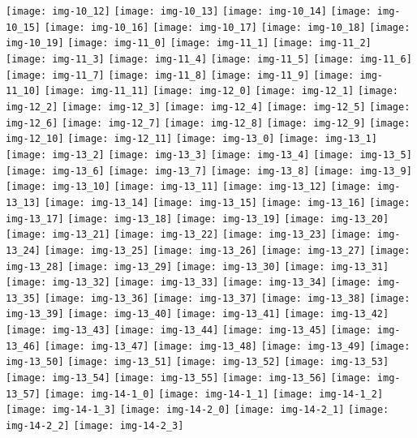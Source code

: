 \documentclass[a4paper]{article}
\begin{document}
	\texttt{[image: img-10\_12]}
	\texttt{[image: img-10\_13]}
	\texttt{[image: img-10\_14]}
	\texttt{[image: img-10\_15]}
	\texttt{[image: img-10\_16]}
	\texttt{[image: img-10\_17]}
	\texttt{[image: img-10\_18]}
	\texttt{[image: img-10\_19]}
	\texttt{[image: img-11\_0]}
	\texttt{[image: img-11\_1]}
	\texttt{[image: img-11\_2]}
	\texttt{[image: img-11\_3]}
	\texttt{[image: img-11\_4]}
	\texttt{[image: img-11\_5]}
	\texttt{[image: img-11\_6]}
	\texttt{[image: img-11\_7]}
	\texttt{[image: img-11\_8]}
	\texttt{[image: img-11\_9]}
	\texttt{[image: img-11\_10]}
	\texttt{[image: img-11\_11]}
	\texttt{[image: img-12\_0]}
	\texttt{[image: img-12\_1]}
	\texttt{[image: img-12\_2]}
	\texttt{[image: img-12\_3]}
	\texttt{[image: img-12\_4]}
	\texttt{[image: img-12\_5]}
	\texttt{[image: img-12\_6]}
	\texttt{[image: img-12\_7]}
	\texttt{[image: img-12\_8]}
	\texttt{[image: img-12\_9]}
	\texttt{[image: img-12\_10]}
	\texttt{[image: img-12\_11]}
	\texttt{[image: img-13\_0]}
	\texttt{[image: img-13\_1]}
	\texttt{[image: img-13\_2]}
	\texttt{[image: img-13\_3]}
	\texttt{[image: img-13\_4]}
	\texttt{[image: img-13\_5]}
	\texttt{[image: img-13\_6]}
	\texttt{[image: img-13\_7]}
	\texttt{[image: img-13\_8]}
	\texttt{[image: img-13\_9]}
	\texttt{[image: img-13\_10]}
	\texttt{[image: img-13\_11]}
	\texttt{[image: img-13\_12]}
	\texttt{[image: img-13\_13]}
	\texttt{[image: img-13\_14]}
	\texttt{[image: img-13\_15]}
	\texttt{[image: img-13\_16]}
	\texttt{[image: img-13\_17]}
	\texttt{[image: img-13\_18]}
	\texttt{[image: img-13\_19]}
	\texttt{[image: img-13\_20]}
	\texttt{[image: img-13\_21]}
	\texttt{[image: img-13\_22]}
	\texttt{[image: img-13\_23]}
	\texttt{[image: img-13\_24]}
	\texttt{[image: img-13\_25]}
	\texttt{[image: img-13\_26]}
	\texttt{[image: img-13\_27]}
	\texttt{[image: img-13\_28]}
	\texttt{[image: img-13\_29]}
	\texttt{[image: img-13\_30]}
	\texttt{[image: img-13\_31]}
	\texttt{[image: img-13\_32]}
	\texttt{[image: img-13\_33]}
	\texttt{[image: img-13\_34]}
	\texttt{[image: img-13\_35]}
	\texttt{[image: img-13\_36]}
	\texttt{[image: img-13\_37]}
	\texttt{[image: img-13\_38]}
	\texttt{[image: img-13\_39]}
	\texttt{[image: img-13\_40]}
	\texttt{[image: img-13\_41]}
	\texttt{[image: img-13\_42]}
	\texttt{[image: img-13\_43]}
	\texttt{[image: img-13\_44]}
	\texttt{[image: img-13\_45]}
	\texttt{[image: img-13\_46]}
	\texttt{[image: img-13\_47]}
	\texttt{[image: img-13\_48]}
	\texttt{[image: img-13\_49]}
	\texttt{[image: img-13\_50]}
	\texttt{[image: img-13\_51]}
	\texttt{[image: img-13\_52]}
	\texttt{[image: img-13\_53]}
	\texttt{[image: img-13\_54]}
	\texttt{[image: img-13\_55]}
	\texttt{[image: img-13\_56]}
	\texttt{[image: img-13\_57]}
	\texttt{[image: img-14-1\_0]}
	\texttt{[image: img-14-1\_1]}
	\texttt{[image: img-14-1\_2]}
	\texttt{[image: img-14-1\_3]}
	\texttt{[image: img-14-2\_0]}
	\texttt{[image: img-14-2\_1]}
	\texttt{[image: img-14-2\_2]}
	\texttt{[image: img-14-2\_3]}
\end{document}
